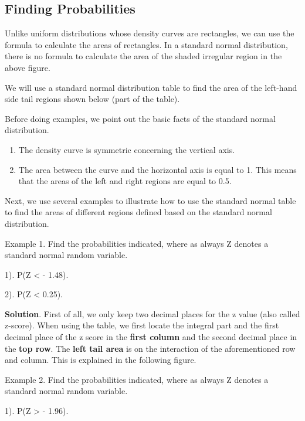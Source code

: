 \documentclass[
]{book}
\begin{document}
\hfill\break

\hypertarget{finding-probabilities}{%
\subsection{Finding Probabilities}\label{finding-probabilities}}

Unlike uniform distributions whose density curves are rectangles, we can use the formula to calculate the areas of rectangles. In a standard normal distribution, there is no formula to calculate the area of the shaded irregular region in the above figure.

We will use a standard normal distribution table to find the area of the left-hand side tail regions shown below (part of the table).

Before doing examples, we point out the basic facts of the standard normal distribution.

\begin{enumerate}
\def\labelenumi{\arabic{enumi}.}
\item
  The density curve is symmetric concerning the vertical axis.
\item
  The area between the curve and the horizontal axis is equal to 1. This means that the areas of the left and right regions are equal to 0.5.
\end{enumerate}

Next, we use several examples to illustrate how to use the standard normal table to find the areas of different regions defined based on the standard normal distribution.

Example 1. Find the probabilities indicated, where as always Z denotes a standard normal random variable.

1). P(Z \textless{} - 1.48).

2). P(Z \textless{} 0.25).

\textbf{Solution}. First of all, we only keep two decimal places for the z value (also called z-score). When using the table, we first locate the integral part and the first decimal place of the z score in the \textbf{first column} and the second decimal place in the \textbf{top row}. The \textbf{left tail area} is on the interaction of the aforementioned row and column. This is explained in the following figure.

Example 2. Find the probabilities indicated, where as always Z denotes a standard normal random variable.

1). P(Z \textgreater{} - 1.96).
\end{document}
